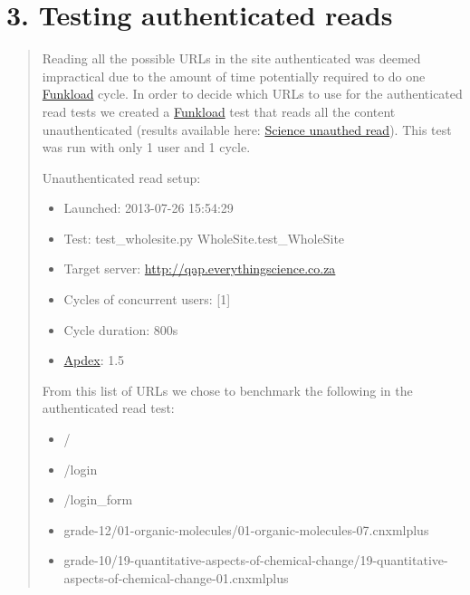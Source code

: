 \documentclass[letterpaper,10pt,english]{sphinxmanual}
\begin{document}
\chapter{3. Testing authenticated reads}
\label{index:testing-authenticated-reads}\begin{quote}

Reading all the possible URLs in the site authenticated was deemed
impractical due to the amount of time potentially required to do one
\href{http://funkload.nuxeo.org}{Funkload} cycle.  In order to decide which URLs to use for the authenticated
read tests we created a \href{http://funkload.nuxeo.org}{Funkload} test that reads all the content
unauthenticated (results available here: \href{http://197.221.50.101/stats/test\_WholeSite-20130726T155429/}{Science unauthed read}).  This
test was run with only 1 user and 1 cycle.

Unauthenticated read setup:
\begin{itemize}
\item {} 
Launched: 2013-07-26 15:54:29

\item {} 
Test: test\_wholesite.py WholeSite.test\_WholeSite

\item {} 
Target server: \href{http://qap.everythingscience.co.za}{http://qap.everythingscience.co.za}

\item {} 
Cycles of concurrent users: {[}1{]}

\item {} 
Cycle duration: 800s

\item {} 
\href{http://apdex.org/}{Apdex}: 1.5

\end{itemize}

From this list of URLs we chose to benchmark the following in the
authenticated read test:
\begin{itemize}
\item {} 
/

\item {} 
/login

\item {} 
/login\_form

\item {} 
grade-12/01-organic-molecules/01-organic-molecules-07.cnxmlplus

\item {} 
grade-10/19-quantitative-aspects-of-chemical-change/19-quantitative-aspects-of-chemical-change-01.cnxmlplus


\end{itemize}
\end{quote}
\end{document}
